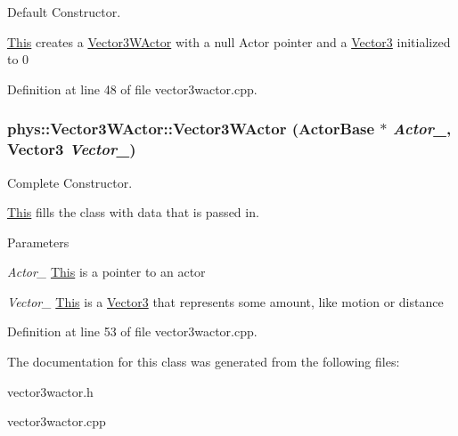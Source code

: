 Default Constructor. 

\hyperlink{structThis}{This} creates a \hyperlink{classphys_1_1Vector3WActor}{Vector3WActor} with a null Actor pointer and a \hyperlink{classphys_1_1Vector3}{Vector3} initialized to 0 

Definition at line 48 of file vector3wactor.cpp.

\hypertarget{classphys_1_1Vector3WActor_ac87c4c55b9260f47f56fb01b6f061ded}{
\subsubsection[{Vector3WActor}]{\setlength{\rightskip}{0pt plus 5cm}phys::Vector3WActor::Vector3WActor ({\bf ActorBase} $\ast$ {\em Actor\_\-}, \/  {\bf Vector3} {\em Vector\_\-})}}
\label{d2/de8/classphys_1_1Vector3WActor_ac87c4c55b9260f47f56fb01b6f061ded}


Complete Constructor. 

\hyperlink{structThis}{This} fills the class with data that is passed in. 
\begin{DoxyParams}{Parameters}
\item[{\em Actor\_\-}]\hyperlink{structThis}{This} is a pointer to an actor \item[{\em Vector\_\-}]\hyperlink{structThis}{This} is a \hyperlink{classphys_1_1Vector3}{Vector3} that represents some amount, like motion or distance \end{DoxyParams}


Definition at line 53 of file vector3wactor.cpp.



The documentation for this class was generated from the following files:\begin{DoxyCompactItemize}
\item 
vector3wactor.h\item 
vector3wactor.cpp\end{DoxyCompactItemize}
